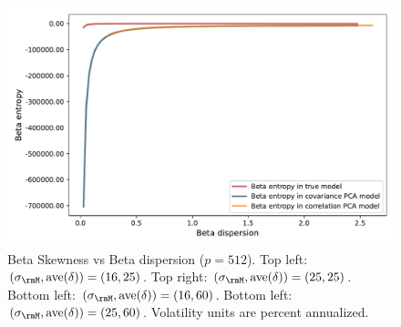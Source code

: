 \documentclass[leqno,12pt]{article}
\begin{document}
{\begin{figure}[htp]
\begin{center}
  \includegraphics[scale=0.33]{img/DispersionvsEntropy1factorsN512T256fvol25minsvol30maxsvol90}
\end{center}
\caption{Beta Skewness vs Beta dispersion
($p = 512$). 
Top left: $(\sigma_\rmM, \text{ave}(\delta)) = (16,25)$.
Top right: $(\sigma_\rmM, \text{ave}(\delta)) = (25,25)$.
Bottom left: $(\sigma_\rmM, \text{ave}(\delta)) = (16,60)$.
Bottom left: $(\sigma_\rmM, \text{ave}(\delta)) = (25,60)$.
Volatility units are percent annualized.}
\end{figure}

}
\end{document}

